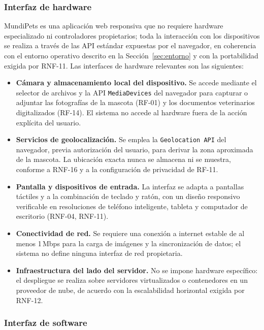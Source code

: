 \documentclass[journal,onecolumn]{IEEEtran}
\begin{document}
	\subsubsection{Interfaz de hardware}
	\label{sec:interfaz-hardware}
	
	MundiPets es una aplicación web responsiva que no requiere hardware
	especializado ni controladores propietarios; toda la interacción con los
	dispositivos se realiza a través de las API estándar expuestas por el
	navegador, en coherencia con el entorno operativo descrito en la
	Sección~\ref{sec:entorno} y con la portabilidad exigida por RNF-11. Las
	interfaces de hardware relevantes son las siguientes:
	
	\begin{itemize}[leftmargin=*]
		\item \textbf{Cámara y almacenamiento local del dispositivo.} Se accede
		mediante el selector de archivos y la API \texttt{MediaDevices} del
		navegador para capturar o adjuntar las fotografías de la mascota (RF-01)
		y los documentos veterinarios digitalizados (RF-14). El sistema no accede
		al hardware fuera de la acción explícita del usuario.
		\item \textbf{Servicios de geolocalización.} Se emplea la
		\texttt{Geolocation API} del navegador, previa autorización del usuario,
		para derivar la zona aproximada de la mascota. La ubicación exacta nunca
		se almacena ni se muestra, conforme a RNF-16 y a la configuración de
		privacidad de RF-11.
		\item \textbf{Pantalla y dispositivos de entrada.} La interfaz se adapta a
		pantallas táctiles y a la combinación de teclado y ratón, con un diseño
		responsivo verificable en resoluciones de teléfono inteligente, tableta y
		computador de escritorio (RNF-04, RNF-11).
		\item \textbf{Conectividad de red.} Se requiere una conexión a internet
		estable de al menos 1\,Mbps para la carga de imágenes y la sincronización
		de datos; el sistema no define ninguna interfaz de red propietaria.
		\item \textbf{Infraestructura del lado del servidor.} No se impone hardware
		específico: el despliegue se realiza sobre servidores virtualizados o
		contenedores en un proveedor de nube, de acuerdo con la escalabilidad
		horizontal exigida por RNF-12.
	\end{itemize}
	
	\subsubsection{Interfaz de software}
	\label{sec:interfaz-software}
	
\end{document}
